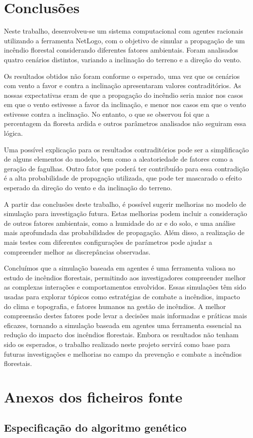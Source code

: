 \documentclass[a4paper, portuguese]{report}
\begin{document}
\chapter{Conclusões}
Neste trabalho, desenvolveu-se um sistema computacional com agentes racionais utilizando a ferramenta NetLogo, com o objetivo de simular a propagação de um incêndio florestal considerando diferentes fatores ambientais. Foram analisados quatro cenários distintos, variando a inclinação do terreno e a direção do vento.

Os resultados obtidos não foram conforme o esperado, uma vez que os cenários com vento a favor e contra a inclinação apresentaram valores contraditórios. As nossas expectativas eram de que a propagação do incêndio seria maior nos casos em que o vento estivesse a favor da inclinação, e menor nos casos em que o vento estivesse contra a inclinação. No entanto, o que se observou foi que a percentagem da floresta ardida e outros parâmetros analisados não seguiram essa lógica.

Uma possível explicação para os resultados contraditórios pode ser a simplificação de alguns elementos do modelo, bem como a aleatoriedade de fatores como a geração de fagulhas. Outro fator que poderá ter contribuído para essa contradição é a alta probabilidade de propagação utilizada, que pode ter mascarado o efeito esperado da direção do vento e da inclinação do terreno.

A partir das conclusões deste trabalho, é possível sugerir melhorias no modelo de simulação para investigação futura. Estas melhorias podem incluir a consideração de outros fatores ambientais, como a humidade do ar e do solo, e uma análise mais aprofundada das probabilidades de propagação. Além disso, a realização de mais testes com diferentes configurações de parâmetros pode ajudar a compreender melhor as discrepâncias observadas.

Concluímos que a simulação baseada em agentes é uma ferramenta valiosa no estudo de incêndios florestais, permitindo aos investigadores compreender melhor as complexas interações e comportamentos envolvidos. Essas simulações têm sido usadas para explorar tópicos como estratégias de combate a incêndios, impacto do clima e topografia, e fatores humanos na gestão de incêndios. A melhor compreensão destes fatores pode levar a decisões mais informadas e práticas mais eficazes, tornando a simulação baseada em agentes uma ferramenta essencial na redução do impacto dos incêndios florestais. Embora os resultados não tenham sido os esperados, o trabalho realizado neste projeto servirá como base para futuras investigações e melhorias no campo da prevenção e combate a incêndios florestais.
\appendix
\chapter{Anexos dos ficheiros fonte}\label{chapter:appendix}
\section{Especificação do algoritmo genético}\label{sec:model_spec}
\inputminted[breaklines]{python}{src/genalg.py}



\end{document}
